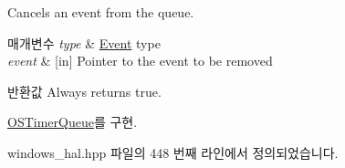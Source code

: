 Cancels an event from the queue. 


\begin{DoxyParams}{매개변수}
{\em type} & \hyperlink{class_event}{Event} type \\
\hline
{\em event} & \mbox{[}in\mbox{]} Pointer to the event to be removed \\
\hline
\end{DoxyParams}
\begin{DoxyReturn}{반환값}
Always returns true. 
\end{DoxyReturn}


\hyperlink{class_o_s_timer_queue_a781246a92c0fa7d331f94829e937243f}{O\+S\+Timer\+Queue}를 구현.



windows\+\_\+hal.\+hpp 파일의 448 번째 라인에서 정의되었습니다.


